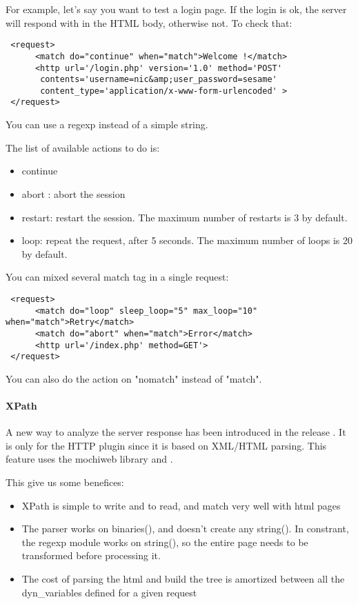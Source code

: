 \documentclass{IDXDOC-en}
\begin{document}
For example, let's say you want to test a login page. If the login is
ok, the server will respond with  in the
HTML body, otherwise not. To check that:
\begin{Verbatim}
 <request>
      <match do="continue" when="match">Welcome !</match>
      <http url='/login.php' version='1.0' method='POST'
       contents='username=nic&amp;user_password=sesame'
       content_type='application/x-www-form-urlencoded' >
 </request>
\end{Verbatim}

You can use a regexp instead of a simple string.

The list of available actions to do is:
\begin{itemize}
\item continue
\item abort : abort the session
\item restart: restart the session. The maximum number of
  restarts is 3 by default.
\item loop: repeat the request, after 5 seconds. The maximum number of
  loops is 20 by default.
\end{itemize}

You can mixed several match tag in a single request:
\begin{Verbatim}
 <request>
      <match do="loop" sleep_loop="5" max_loop="10" when="match">Retry</match>
      <match do="abort" when="match">Error</match>
      <http url='/index.php' method=GET'>
 </request>
\end{Verbatim}

You can also do the action on "nomatch" instead of "match".

\paragraph{XPath}

A new way to analyze the server response has been introduced in the
release . It is only for the HTTP plugin since it is
based on XML/HTML parsing. This feature uses the mochiweb library
and .

This give us some benefices:

\begin{itemize}
\item XPath is simple to write and to read, and match very well with
  html pages
\item The parser works on binaries(), and doesn't create any
  string(). In constrant, the regexp module works on string(), so the
  entire page needs to be  transformed before
  processing it.
\item The cost of parsing the html and build the tree is amortized
  between all the dyn\_variables defined for a given request
\end{itemize}
\end{document}
